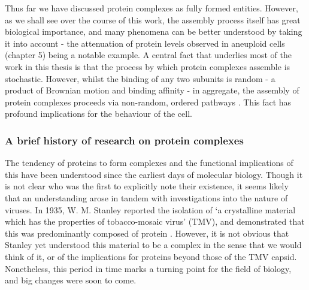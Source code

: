 \documentclass[a4paper,11pt,twoside,openright]{scrbook}
\begin{document}
Thus far we have discussed protein complexes as fully formed entities. However, as we shall see over the course of this work, the assembly process itself has great biological importance, and many phenomena can be better understood by taking it into account - the attenuation of protein levels observed in aneuploid cells (chapter 5) being a notable example. A central fact that underlies most of the work in this thesis is that the process by which protein complexes assemble is stochastic. However, whilst the binding of any two subunits is random - a product of Brownian motion and binding affinity - in aggregate, the assembly of protein complexes proceeds via non-random, ordered pathways \cite{Levy2008a, Marsh2013}. This fact has profound implications for the behaviour of the cell.


\subsubsection{A brief history of research on protein complexes}
The tendency of proteins to form complexes and the functional implications of this have been understood since the earliest days of molecular biology. Though it is not clear who was the first to explicitly note their existence, it seems likely that an understanding arose in tandem with investigations into the nature of viruses. In 1935, W. M. Stanley reported the isolation of `a crystalline material which has the properties of tobacco-mosaic virus' (TMV), and demonstrated that this was predominantly composed of protein \cite{Stanley1935}. However, it is not obvious that Stanley yet understood this material to be a complex in the sense that we would think of it, or of the implications for proteins beyond those of the TMV capsid. Nonetheless, this period in time marks a turning point for the field of biology, and big changes were soon to come.
\end{document}
